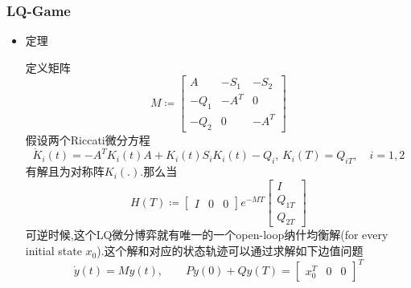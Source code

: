 \documentclass[UTF8, aspectratio=169, 9pt]{ctexbeamer}
\begin{document}
\begin{frame}
\frametitle{LQ-Game}
\begin{itemize}
\item 定理


  定义矩阵
  $$
  M \coloneqq \begin{bmatrix}
  A &  -S_1 & -S_2 \\
 -Q_1 & -A^T & 0\\
 -Q_2 & 0 & -A^T
\end{bmatrix}
  $$
  假设两个Riccati微分方程
  $$
  \dot{K}_i(t) = - A^T K_i(t) A + K_i (t) S_i K_i(t) - Q_i, \, K_i(T) = Q_{iT}, \quad i=1,2
  $$
  有解且为对称阵$K_i(.)$.那么当
  $$
  H(T) \coloneqq \begin{bmatrix} I & 0 & 0 \end{bmatrix} e^{- M T} \begin{bmatrix} I \\ Q_{1T} \\ Q_{2T} \end{bmatrix}
  $$
  可逆时候,这个LQ微分博弈就有唯一的一个open-loop纳什均衡解(for every initial state $x_0$).这个解和对应的状态轨迹可以通过求解如下边值问题
  $$
  \dot{y}(t) = M y(t), \qquad P y(0) + Q y(T) = \begin{bmatrix} x^T_0 & 0 & 0 \end{bmatrix}^T
  $$

\end{itemize}
\end{frame}
\end{document}
